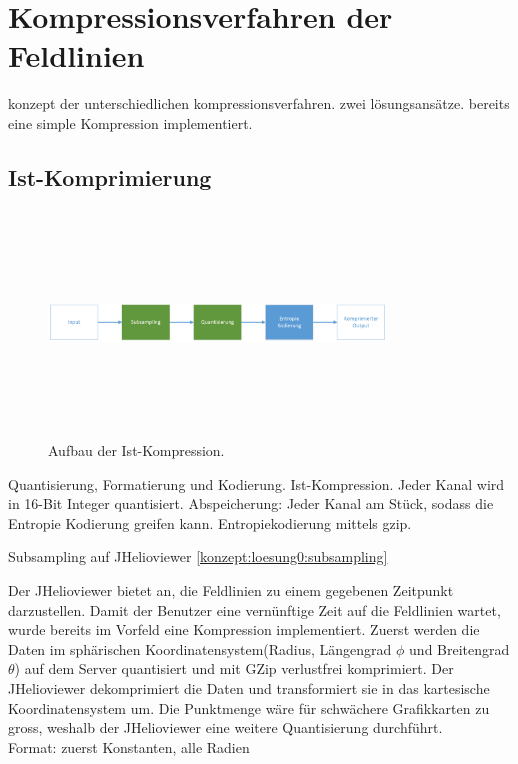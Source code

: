 \section{Kompressionsverfahren der Feldlinien} \label{konzept}
konzept der unterschiedlichen kompressionsverfahren. zwei lösungsansätze. 
bereits eine simple Kompression implementiert.

\subsection{Ist-Komprimierung} \label{konzept:ist-komprimierung}
\begin{figure}[!htbp]
	\center
	\includegraphics[width=0.8\textwidth,height=6cm,keepaspectratio]{./pictures/konzept/ist/aufbau.png}
	\caption{Aufbau der Ist-Kompression.}
	\label{konzept:ist:aufbau:diagramm}
\end{figure} 
Quantisierung, Formatierung und Kodierung. 
Ist-Kompression. Jeder Kanal wird in 16-Bit Integer quantisiert.
Abspeicherung: Jeder Kanal am Stück, sodass die Entropie Kodierung greifen kann. Entropiekodierung mittels gzip.

Subsampling auf JHelioviewer \ref{konzept:loesung0:subsampling}

Der JHelioviewer bietet an, die Feldlinien zu einem gegebenen Zeitpunkt darzustellen. Damit der Benutzer eine vernünftige Zeit auf die Feldlinien wartet, wurde bereits im Vorfeld eine Kompression implementiert. Zuerst werden die Daten im sphärischen Koordinatensystem(Radius, Längengrad $\phi$ und Breitengrad $\theta$) auf dem Server quantisiert und mit GZip verlustfrei komprimiert. Der JHelioviewer dekomprimiert die Daten und transformiert sie in das kartesische Koordinatensystem um. Die Punktmenge wäre für schwächere Grafikkarten zu gross, weshalb der JHelioviewer eine weitere Quantisierung durchführt.\\

Format: zuerst Konstanten, alle Radien\\

